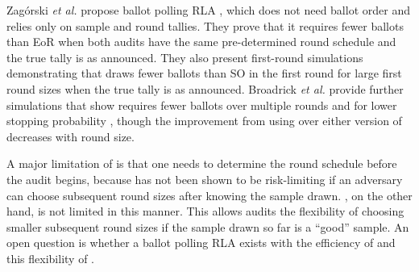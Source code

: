 Zag\'{o}rski {\em et al.} propose ballot polling RLA \Minerva \cite{usenix_minerva}, which does not need ballot order and relies only on sample and round tallies. They prove that it requires fewer ballots than EoR \BRAVO when both audits have the same pre-determined round schedule and the true tally is as announced. 
They also present first-round simulations demonstrating that \Minerva draws fewer ballots than SO \BRAVO in the first round for large first round sizes when the true tally is as announced. 
Broadrick {\em et al.} provide further simulations that show \Minerva requires fewer ballots over multiple rounds and for lower stopping probability \cite{simulations}, though the improvement from using \Minerva over either version of \BRAVO decreases with round size. 

A major limitation of \Minerva is that one needs to determine the round schedule before the audit begins, because \Minerva has not been shown to be risk-limiting if an adversary can choose subsequent round sizes after knowing the sample drawn. \BRAVO, on the other hand, is not limited in this manner. This allows \BRAVO audits the flexibility of choosing smaller subsequent round sizes if the sample drawn so far is a ``good'' sample. An open question is whether a ballot polling RLA exists with the efficiency of \Minerva and this flexibility of \BRAVO.

